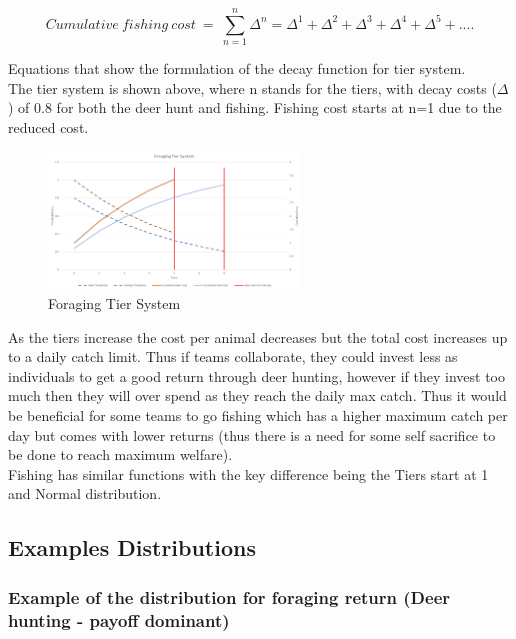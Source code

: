 \begin{equation}
Cumulative\ fishing\ cost \ = \ \sum_{n=1}^{n} \Delta^{n} = \Delta^{1} + \Delta^{2} + \Delta^{3} + \Delta^{4} + \Delta^{5} + ....
\end{equation}

Equations that show the formulation of the decay function for tier system.\\

The tier system is shown above, where n stands for the tiers, with decay costs ($\Delta$) of 0.8 for both the deer hunt and fishing. Fishing cost starts at n=1 due to the reduced cost.\\

\begin{figure}[!htb]
    \centering
    \includegraphics[width=0.6\textwidth]{04_environment/Images/Foraging Tier System.PNG}
    \caption{Foraging Tier System}
    \label{Images:Foraging Tier System}
\end{figure}

As the tiers increase the cost per animal decreases but the total cost increases up to a daily catch limit. Thus if teams collaborate, they could invest less as individuals to get a good return through deer hunting, however if they invest too much then they will over spend as they reach the daily max catch. Thus it would be beneficial for some teams to go fishing which has a higher maximum catch per day but comes with lower returns (thus there is a need for some self sacrifice to be done to reach maximum welfare). \\ 

Fishing has similar functions with the key difference being the Tiers start at 1 and Normal distribution. \\

\subsection{Examples Distributions}
\subsubsection{Example of the distribution for foraging return (Deer hunting - payoff dominant)}

